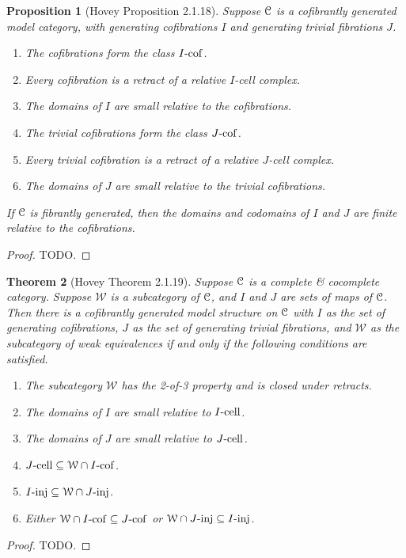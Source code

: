 \documentclass{amsart}
\theoremstyle{plain}
\newtheorem{theorem}{Theorem}[section]
\newtheorem{proposition}[theorem]{Proposition}
\theoremstyle{definition}
\newcommand{\sseq}{\subseteq}
\newcommand{\0}{\mathbf{0}}
\newcommand{\cC}{\mathcal C}
\newcommand{\cW}{\mathcal W}
\renewcommand{\(}{\left(}
\renewcommand{\)}{\right)}
\def\scr{\EuScript}
\def\cC{\scr{C}}
\newcommand{\inj}{\text-\mathrm{inj}}
\newcommand{\cell}{\text-\mathrm{cell}}
\newcommand{\cof}{\text-\mathrm{cof}}
\begin{document}
\begin{proposition}[Hovey Proposition 2.1.18]\label{2.1.18}
  Suppose $\cC$ is a cofibrantly generated model category, with generating cofibrations $I$ and generating trivial fibrations $J$.\begin{enumerate}[label=(\alph*),noitemsep,topsep=0pt]
    \item The cofibrations form the class $I\cof$.
    \item Every cofibration is a retract of a relative $I$-cell complex.
    \item The domains of $I$ are small relative to the cofibrations.
    \item The trivial cofibrations form the class $J\cof$.
    \item Every trivial cofibration is a retract of a relative $J$-cell complex.
    \item The domains of $J$ are small relative to the trivial cofibrations.
  \end{enumerate}
  If $\cC$ is fibrantly generated, then the domains and codomains of $I$ and $J$ are finite relative to the cofibrations.
\end{proposition}
\begin{proof}
  \color{red}TODO.
\end{proof}

\begin{theorem}[Hovey Theorem 2.1.19]\label{2.1.19}
  Suppose $\cC$ is a complete \& cocomplete category. Suppose $\cW$ is a subcategory of $\cC$, and $I$ and $J$ are sets of maps of $\cC$. Then there is a cofibrantly generated model structure on $\cC$ with $I$ as the set of generating cofibrations, $J$ as the set of generating trivial fibrations, and $\cW$ as the subcategory of weak equivalences if and only if the following conditions are satisfied.\begin{enumerate}[label=\arabic*.,noitemsep,topsep=0pt]
    \item The subcategory $\cW$ has the 2-of-3 property and is closed under retracts.
    \item The domains of $I$ are small relative to $I\cell$.
    \item The domains of $J$ are small relative to $J\cell$.
    \item $J\cell\sseq\cW\cap I\cof$.
    \item $I\inj\sseq\cW\cap J\inj$.
    \item Either $\cW\cap I\cof\sseq J\cof$ or $\cW\cap J\inj\sseq I\inj$.
  \end{enumerate}
\end{theorem}
\begin{proof}
  \color{red}TODO.
\end{proof}
\end{document}
